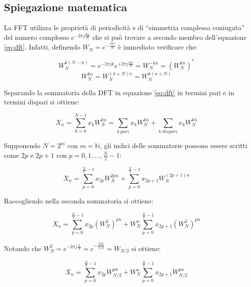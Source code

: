 \subsection{Spiegazione matematica}
La FFT utilizza le proprietà di periodicità e di ``simmetria complessa coniugata'' del numero complesso $e^{-2\pi j\frac{kn}{N}}$ che si può trovare a secondo membro dell'equazione \ref{eq:dft}. Infatti, definendo $W_N=e^{-\frac{2\pi j}{N}}$ è immediato verificare che:

\begin{equation}
    W_N^{k(N-n)} = e^{-2\pi jk}e^{+2\pi j\frac{kn}{N}} = W_N^{-kn} = (W_N^{kn})^\ast
\end{equation}
\begin{equation}
    W_N^{kn} = W_N^{(k+N)n} = W_N^{k(n+N)}
    \label{eq:wnperiodica}
\end{equation}

Separando la sommatoria della DFT in equazione \ref{eq:dft} in termini pari e in termini dispari si ottiene:

\begin{equation}
    X_n = \displaystyle\sum_{k=0}^{N-1}x_k W_N^{kn} = \displaystyle\sum_{k\ pari}x_k W_N^{kn} + \displaystyle\sum_{k\ dispari}x_k W_N^{kn}
\end{equation}

Supponendo $N=2^m$ con $m=\mathbb{N}$, gli indici delle sommatorie possono essere scritti come $2p$ e $2p+1$ con $p=0,1,\dots,\frac{N}{2}-1$:

\begin{equation}
    X_n = \displaystyle\sum_{p=0}^{\frac{N}{2}-1}x_{2p} W_N^{2pn} + \displaystyle\sum_{p=0}^{\frac{N}{2}-1}x_{2p+1} W_N^{(2p+1)n}
\end{equation}

Raccogliendo nella seconda sommatoria si ottiene:

\begin{equation}
    X_n = \displaystyle\sum_{p=0}^{\frac{N}{2}-1}x_{2p} (W_N^2)^{pn} + W_N^{n}\displaystyle\sum_{p=0}^{\frac{N}{2}-1}x_{2p+1} (W_N^2)^{pn}
\end{equation}

Notando che $W_N^2 = e^{-2\pi j\frac{2}{N}} = e^{-\frac{2\pi j}{N/2}} = W_{N/2}$ si ottiene:

\begin{equation}
    X_n = \displaystyle\sum_{p=0}^{\frac{N}{2}-1}x_{2p} W_{N/2}^{pn} + W_N^{n}\displaystyle\sum_{p=0}^{\frac{N}{2}-1}x_{2p+1} W_{N/2}^{pn}
    \label{eq:dftnsu2}
\end{equation}

